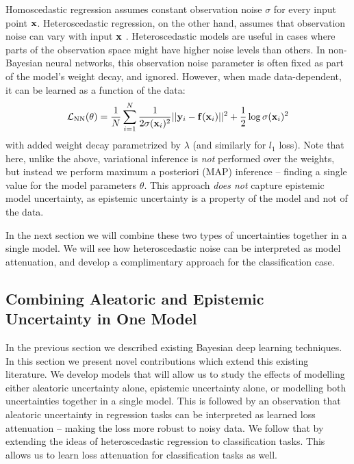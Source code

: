 Homoscedastic regression assumes constant observation noise $\sigma$ for every input point $\mathbf{x}$. Heteroscedastic regression, on the other hand, assumes that observation noise can vary with input $\mathbf{x}$ \citep{nix1994estimating, le2005heteroscedastic}. Heteroscedastic models are useful in cases where parts of the observation space might have higher noise levels than others.
In non-Bayesian neural networks, this observation noise parameter is often fixed as part of the model's weight decay, and ignored. However, when made data-dependent, it can be learned as a function of the data:
\begin{equation}
\cL_\text{NN}(\theta) = \frac{1}{N} \sum_{i=1}^N \frac{1}{2\sigma(\x_i)^2} ||\y_i - \f(\x_i)||^2 + \frac{1}{2} \log \sigma(\x_i)^2 %
\end{equation}
with added weight decay parametrized by $\lambda$ (and similarly for $l_1$ loss).
Note that here, unlike the above, variational inference is \textit{not} performed over the weights, but instead we perform maximum a posteriori (MAP) inference -- finding a single value for the model parameters $\theta$. This approach \textit{does not} capture epistemic model uncertainty, as epistemic uncertainty is a property of the model and not of the data.

In the next section we will combine these two types of uncertainties together in a single model. We will see how heteroscedastic noise can be interpreted as model attenuation, and develop a complimentary approach for the classification case. %


\subsection{Combining Aleatoric and Epistemic Uncertainty in One Model}
\label{sec:method}

In the previous section we described existing Bayesian deep learning techniques. In this section we present novel contributions which extend this existing literature. We develop models that will allow us to study the effects of modelling either aleatoric uncertainty alone, epistemic uncertainty alone, or modelling both uncertainties together in a single model. This is followed by an observation that aleatoric uncertainty in regression tasks can be interpreted as learned loss attenuation -- making the loss more robust to noisy data. We follow that by extending the ideas of heteroscedastic regression to classification tasks. This allows us to learn loss attenuation for classification tasks as well. %


